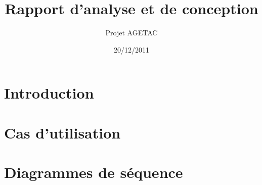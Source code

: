 \documentclass{article}
\title{Rapport d'analyse et de conception}
\subtitle{Projet AGETAC}
\date{20/12/2011}
\begin{document}
 
\section*{Introduction}

\section{Cas d'utilisation}

\section{Diagrammes de séquence}
\end{document}
